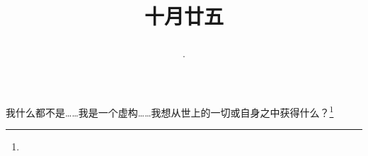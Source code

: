 \title{\date[d=25,m=11,y=2024][year:cn-y,年,month:cn,day:cn,日,·,weekday]·十月廿五 }
我什么都不是……我是一个虚构……我想从世上的一切或自身之中获得什么？\footnote{ }

